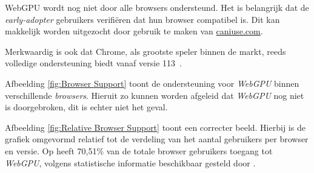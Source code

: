 WebGPU wordt nog niet door alle browsers ondersteund. Het is belangrijk dat de \textit{early-adopter} gebruikers verifiëren dat hun browser compatibel is. Dit kan makkelijk worden uitgezocht door gebruik te maken van \href{https://caniuse.com/webgpu}{caniuse.com}.

\bigbreak{}

Merkwaardig is ook dat Chrome, als grootste speler binnen de markt, reeds volledige ondersteuning biedt vanaf versie 113~\autocite{Deveria2024}.

\bigbreak{}

Afbeelding \ref{fig:Browser Support} toont de ondersteuning voor \textit{WebGPU} binnen verschillende \textit{browsers}. Hieruit zo kunnen worden afgeleid dat \textit{WebGPU} nog niet is doorgebroken, dit is echter niet het geval.

\bigbreak{}
\date{}

Afbeelding \ref{fig:Relative Browser Support} toont een correcter beeld. Hierbij is de grafiek omgevormd relatief tot de verdeling van het aantal gebruikers per browser en versie. Op   heeft 70,51\% van de totale browser gebruikers toegang tot \textit{WebGPU}, volgens statistische informatie beschikbaar gesteld door \textcite{Deveria2024}.